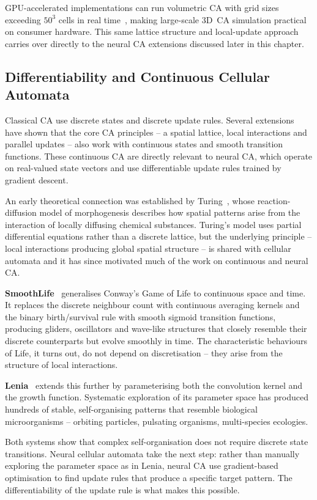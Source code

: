 GPU-accelerated implementations can run volumetric CA with grid sizes exceeding
$50^3$ cells in real time~\cite{Tobias2009}, making large-scale 3D~CA simulation
practical on consumer hardware. This same lattice structure and local-update approach
carries over directly to the neural CA extensions discussed later in this chapter.

\subsection{Differentiability and Continuous Cellular Automata}

Classical CA use discrete states and discrete update rules. Several extensions have
shown that the core CA principles -- a spatial lattice, local interactions and
parallel updates -- also work with continuous states and smooth transition functions.
These continuous CA are directly relevant to neural CA, which operate on real-valued
state vectors and use differentiable update rules trained by gradient descent.

An early theoretical connection was established by Turing~\cite{Turing1952}, whose
reaction-diffusion model of morphogenesis describes how spatial patterns arise from
the interaction of locally diffusing chemical substances. Turing's model uses partial
differential equations rather than a discrete lattice, but the underlying principle --
local interactions producing global spatial structure -- is shared with cellular
automata and it has since motivated much of the work on continuous and neural CA.

\textbf{SmoothLife}~\cite{Rafler2011} generalises Conway's Game of Life to continuous
space and time. It replaces the discrete neighbour count with continuous averaging
kernels and the binary birth/survival rule with smooth sigmoid transition functions,
producing gliders, oscillators and wave-like structures that closely resemble their
discrete counterparts but evolve smoothly in time. The characteristic behaviours of
Life, it turns out, do not depend on discretisation -- they arise from the structure
of local interactions.

\textbf{Lenia}~\cite{Chan2019} extends this further by parameterising both the
convolution kernel and the growth function. Systematic exploration of its parameter
space has produced hundreds of stable, self-organising patterns that resemble
biological microorganisms -- orbiting particles, pulsating organisms, multi-species
ecologies.

Both systems show that complex self-organisation does not require discrete state
transitions. Neural cellular automata take the next step: rather than manually
exploring the parameter space as in Lenia, neural CA use gradient-based optimisation
to find update rules that produce a specific target pattern. The differentiability of
the update rule is what makes this possible.

